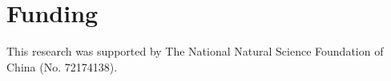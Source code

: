 \section{Funding}\label{Funding}
This research was supported by The National Natural Science Foundation of China (No. 72174138).
